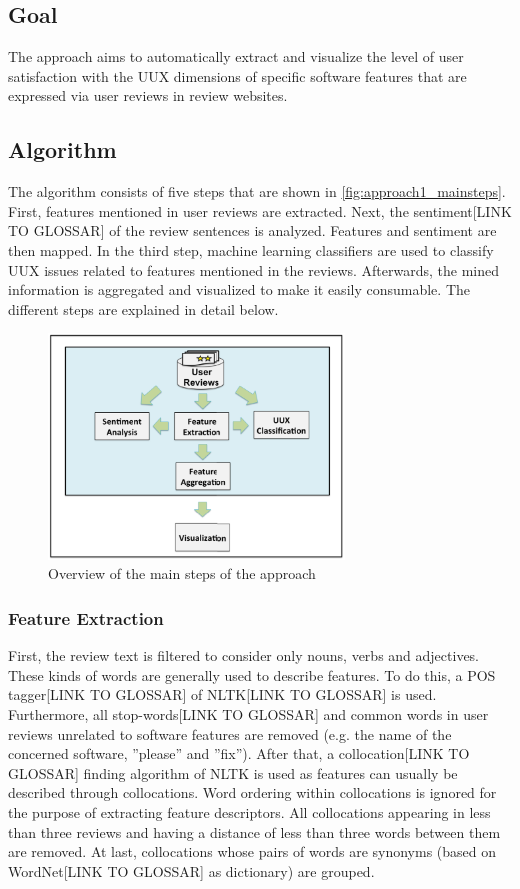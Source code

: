 \subsection{Goal}
The approach aims to automatically extract and visualize the level of user satisfaction with the UUX dimensions of specific software features that are expressed via user reviews in review websites.

\subsection{Algorithm}
The algorithm consists of five steps that are shown in \autoref{fig:approach1_mainsteps}. First, features mentioned in user reviews are extracted. Next, the sentiment[LINK TO GLOSSAR] of the review sentences is analyzed. Features and sentiment are then mapped. In the third step, machine learning classifiers are used to classify UUX issues related to features mentioned in the reviews. Afterwards, the mined information is aggregated and visualized to make it easily consumable. The different steps are explained in detail below.

\begin{figure}
    \centering
    \includegraphics[width=0.7\textwidth]{images/Thema4_Approach1_MainSteps.png}
    \caption{Overview of the main steps of the approach \cite[Figure 1]{Bakiu2017}}
    \label{fig:approach1_mainsteps}
\end{figure}

\subsubsection*{Feature Extraction}
First, the review text is filtered to consider only nouns, verbs and adjectives. These kinds of words are generally used to describe features. To do this, a POS tagger[LINK TO GLOSSAR] of NLTK[LINK TO GLOSSAR] is used. Furthermore, all stop-words[LINK TO GLOSSAR] and common words in user reviews unrelated to software features are removed (e.g. the name of the concerned software, ''please'' and ''fix''). After that, a collocation[LINK TO GLOSSAR] finding algorithm of NLTK is used as features can usually be described through collocations. Word ordering within collocations is ignored for the purpose of extracting feature descriptors. All collocations appearing in less than three reviews and having a distance of less than three words between them are removed. At last, collocations whose pairs of words are synonyms (based on WordNet[LINK TO GLOSSAR] as dictionary) are grouped.

